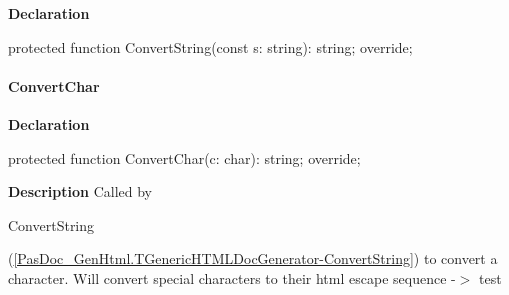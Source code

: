 \documentclass{report}
\newif\ifpdf
\begin{document}
\label{PasDoc_GenHtml.TGenericHTMLDocGenerator-ConvertString}
\begin{list}{}{
\setlength{\itemindent}{0cm}
\setlength{\listparindent}{0cm}
\setlength{\leftmargin}{\evensidemargin}
\addtolength{\leftmargin}{\tmplength}
\settowidth{\labelsep}{X}
\addtolength{\leftmargin}{\labelsep}
\setlength{\labelwidth}{\tmplength}
}
\item[\textbf{Declaration}\hfill]
\ifpdf
\begin{flushleft}
\fi
\begin{ttfamily}
protected function ConvertString(const s: string): string; override;\end{ttfamily}

\ifpdf
\end{flushleft}
\fi

\end{list}
\paragraph*{ConvertChar}\hspace*{\fill}

\label{PasDoc_GenHtml.TGenericHTMLDocGenerator-ConvertChar}
\begin{list}{}{
\setlength{\itemindent}{0cm}
\setlength{\listparindent}{0cm}
\setlength{\leftmargin}{\evensidemargin}
\addtolength{\leftmargin}{\tmplength}
\settowidth{\labelsep}{X}
\addtolength{\leftmargin}{\labelsep}
\setlength{\labelwidth}{\tmplength}
}
\item[\textbf{Declaration}\hfill]
\ifpdf
\begin{flushleft}
\fi
\begin{ttfamily}
protected function ConvertChar(c: char): string; override;\end{ttfamily}

\ifpdf
\end{flushleft}
\fi

\par
\item[\textbf{Description}]
Called by \begin{ttfamily}ConvertString\end{ttfamily}(\ref{PasDoc_GenHtml.TGenericHTMLDocGenerator-ConvertString}) to convert a character. Will convert special characters to their html escape sequence {-}{$>$} test

\end{list}
\end{document}

